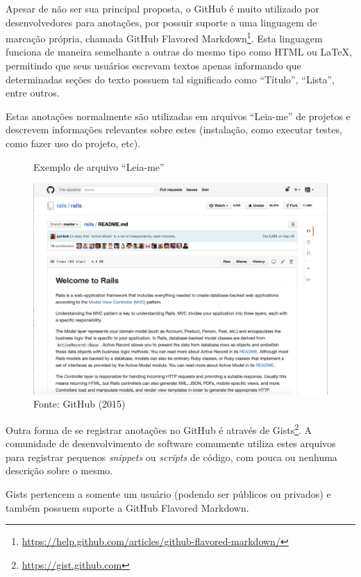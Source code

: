 Apesar de não ser sua principal proposta, o GitHub é muito utilizado por desenvolvedores para anotações, por possuir suporte a uma linguagem de marcação própria, chamada GitHub Flavored Markdown\footnote{\url{https://help.github.com/articles/github-flavored-markdown/}}. Esta linguagem funciona de maneira semelhante a outras do mesmo tipo como HTML ou LaTeX, permitindo que seus usuários escrevam textos apenas informando que determinadas seções do texto possuem tal significado como ``Título'', ``Lista'', entre outros.

Estas anotações normalmente são utilizadas em arquivos ``Leia-me'' de projetos e descrevem informações relevantes sobre estes (instalação, como executar testes, como fazer uso do projeto, etc).

\begin{figure}[h]
	\centering
    \caption{Exemplo de arquivo ``Leia-me''}
    \includegraphics[width=15cm]{Imagens/print-readme.png}
	\caption*{Fonte: GitHub (2015)}
\end{figure}


Outra forma de se registrar anotações no GitHub é através de Gists\footnote{\url{https://gist.github.com}}. A comunidade de desenvolvimento de software comumente utiliza estes arquivos para registrar pequenos \textit{snippets} ou \textit{scripts} de código, com pouca ou nenhuma descrição sobre o mesmo.

Gists pertencem a somente um usuário (podendo ser públicos ou privados) e também possuem suporte a GitHub Flavored Markdown.

